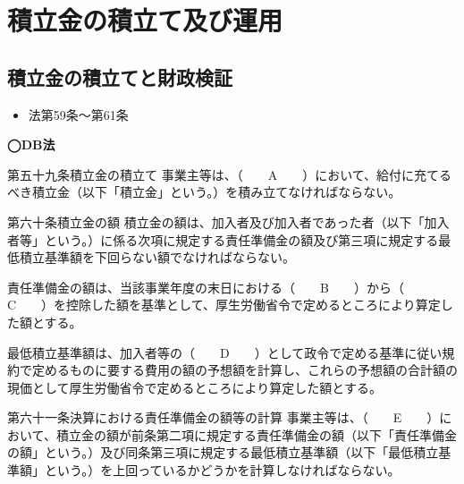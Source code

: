 \section{積立金の積立て及び運用}

\subsection{積立金の積立てと財政検証}


\begin{InyouJobunbox}
  \begin{itemize}
    \item 法第59条〜第61条
  \end{itemize}
\end{InyouJobunbox}

\begin{fillblank}[自作 2026/11/9]
  \noindent \textbf{◯DB法}
  \begin{lawstructure}
    \begin{lawarticle}{第五十九条}{積立金の積立て}
      事業主等は、（　　A　　）において、給付に充てるべき積立金（以下「積立金」という。）を積み立てなければならない。
    \end{lawarticle}

    \begin{lawarticle}{第六十条}{積立金の額}
      積立金の額は、加入者及び加入者であった者（以下「加入者等」という。）に係る次項に規定する責任準備金の額及び第三項に規定する最低積立基準額を下回らない額でなければならない。

      責任準備金の額は、当該事業年度の末日における（　　B　　）から（　　C　　）を控除した額を基準として、厚生労働省令で定めるところにより算定した額とする。

      最低積立基準額は、加入者等の（　　D　　）として政令で定める基準に従い規約で定めるものに要する費用の額の予想額を計算し、これらの予想額の合計額の現価として厚生労働省令で定めるところにより算定した額とする。
    \end{lawarticle}

    \begin{lawarticle}{第六十一条}{決算における責任準備金の額等の計算}
      事業主等は、（　　E　　）において、積立金の額が前条第二項に規定する責任準備金の額（以下「責任準備金の額」という。）及び同条第三項に規定する最低積立基準額（以下「最低積立基準額」という。）を上回っているかどうかを計算しなければならない。
    \end{lawarticle}
  \end{lawstructure}
\end{fillblank}

